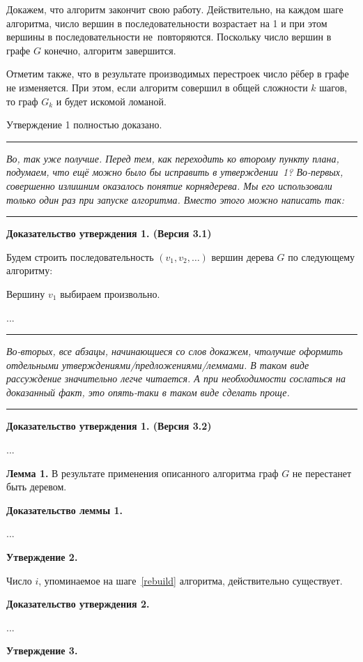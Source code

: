 \documentclass[a4paper,12pt]{article}
\begin{document}
Докажем, что алгоритм закончит свою работу. Действительно, на каждом шаге алгоритма, число вершин в последовательности возрастает на 1 и при этом вершины в последовательности не~повторяются. Поскольку число вершин в графе $G$ конечно, алгоритм завершится.

Отметим также, что в результате производимых перестроек число рёбер в графе не изменяется. При этом, если алгоритм совершил в общей сложности $k$ шагов, то граф $G_k$ и будет искомой ломаной.

Утверждение 1 полностью доказано.
\medskip
\hrule
\bigskip

\emph{
Во, так уже получше. Перед тем, как переходить ко второму пункту плана, подумаем, что ещё можно было бы исправить в утверждении~1? Во-первых, совершенно излишним оказалось понятие  корня дерева. Мы его использовали только один раз при запуске алгоритма. Вместо этого можно написать так:
}

\bigskip
\hrule
\medskip
{\bf Доказательство утверждения 1. (Версия 3.1)}

Будем строить последовательность $(v_1, v_2, \ldots)$ вершин дерева $G$ по следующему алгоритму:
\begin{nums}{0}
\item
\label{start}
Вершину $v_1$ выбираем произвольно.
\end{nums}

\noindent
...
\medskip
\hrule
\bigskip

\emph{
Во-вторых, все абзацы, начинающиеся со слов  докажем, что лучше оформить отдельными утверждениями/предложениями/леммами. В таком виде рассуждение значительно легче читается. А при необходимости сослаться на доказанный факт, это опять-таки в таком виде сделать проще.
}

\bigskip
\hrule
\medskip
{\bf Доказательство утверждения 1. (Версия 3.2)}

\noindent
...

{\bf Лемма 1.}
В результате применения описанного алгоритма граф $G$ не перестанет быть деревом.

{\bf Доказательство леммы 1.}

\noindent
...

{\bf Утверждение 2.}

Число $i$, упоминаемое на шаге~\ref{rebuild} алгоритма, действительно существует.

{\bf Доказательство утверждения 2.}

\noindent
...

{\bf Утверждение 3.}
\end{document}
